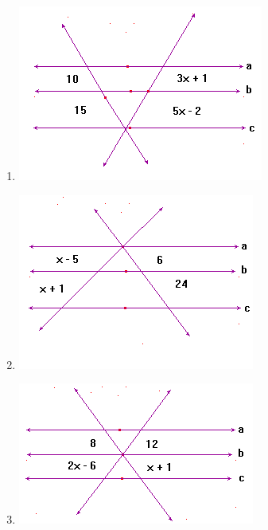 \begin{multicols}{2}
\begin{enumerate}
			\item \includegraphics[scale=0.7]{figuras/fig50.png}
			\item \includegraphics[scale=0.7]{figuras/fig51.png}
			\item \includegraphics[scale=0.7]{figuras/fig52.png}
		\end{enumerate}
		\end{multicols}
		
